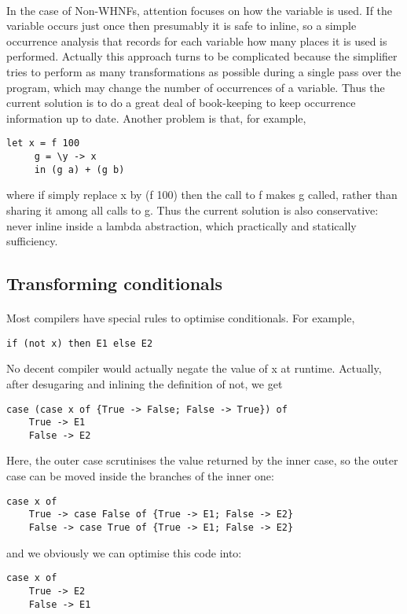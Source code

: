 \documentclass{article}
\begin{document}
	\paragraph{}
	In the case of Non-WHNFs, attention focuses on how the variable is used. If the variable occurs just once then presumably it is safe to inline, so a simple occurrence analysis that records for each variable how many places it is used is performed. Actually this approach turns to be complicated because the simplifier tries to perform as many transformations as possible during a single pass over the program, which may change the number of occurrences of a variable. Thus the current solution is to do a great deal of book-keeping to keep occurrence information up to date. Another problem is that, for example,
	\begin{lstlisting}
let x = f 100
     g = \y -> x
     in (g a) + (g b)
	\end{lstlisting}
	where if simply replace x by (f 100) then the call to f makes g called, rather than sharing it among all calls to g. Thus the current solution is also conservative: never inline inside a lambda abstraction, which practically and statically sufficiency.
	\subsection{Transforming conditionals}
	\paragraph{}
	Most compilers have special rules to optimise conditionals. For example,
	\begin{lstlisting}
if (not x) then E1 else E2
	\end{lstlisting}
	No decent compiler would actually negate the value of x at runtime. Actually, after desugaring and inlining the definition of not, we get
	\begin{lstlisting}
case (case x of {True -> False; False -> True}) of
	True -> E1
	False -> E2
	\end{lstlisting}
	Here, the outer case scrutinises the value returned by the inner case, so the outer case can be moved inside the branches of the inner one:
	\begin{lstlisting}
case x of
	True -> case False of {True -> E1; False -> E2}
	False -> case True of {True -> E1; False -> E2}
	\end{lstlisting}
	and we obviously we can optimise this code into:
	\begin{lstlisting}
case x of
	True -> E2
	False -> E1
	\end{lstlisting}
\end{document}
